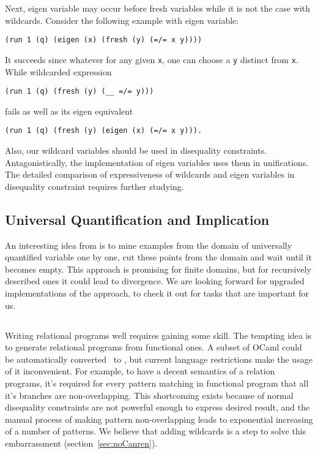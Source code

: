 Next, eigen variable may occur before fresh variables while it is not the case with wildcards.
Consider the following example with eigen variable:
\begin{lstlisting}[xleftmargin=0.5cm]
(run 1 (q) (eigen (x) (fresh (y) (=/= x y))))
\end{lstlisting}
It succeeds since whatever for any given \lstinline{x}, one can choose a \lstinline{y} distinct from \lstinline{x}.
While wildcarded expression
\begin{lstlisting}[xleftmargin=1cm]
(run 1 (q) (fresh (y) (__ =/= y)))
\end{lstlisting}
fails as well as its eigen equivalent
\begin{lstlisting}[xleftmargin=0.5cm]
(run 1 (q) (fresh (y) (eigen (x) (=/= x y))).
\end{lstlisting}

Also, our wildcard variables should be used in disequality constraints.
Antagonistically, the implementation of eigen variables uses them in unifications.
The detailed comparison of expressiveness of wildcards and eigen variables in disequality constraint requires further studying.

\subsection{Universal Quantification and Implication}

An interesting idea from \cite{universal2021} is to mine examples from the domain of universally quantified variable one by one, cut these points from the domain and wait until it becomes empty. This approach is promising for finite domains, but for recursively described ones it could lead to divergence. We are looking forward for upgraded implementations of the approach, to check it out for tasks that are important for us.

\subsection{\noCanren{}}

Writing relational programs well requires gaining some skill. The tempting idea is to generate relational programs from functional ones.
A subset of OCaml could be automatically converted~\cite{RelConversion} to \OCanren{}, but current language restrictions make the usage of it inconvenient. For example, to have a decent semantics of a relation programs, it's required for every pattern matching in functional program that all it's branches are non-overlapping.
This shortcoming exists because of normal disequality constraints are not powerful enough to express desired result, and the manual process of making pattern non-overlapping leads to exponential increasing of a number of patterns.
We believe that adding wildcards is a step to solve this embarrassment (section~\ref{sec:noCanren}).

